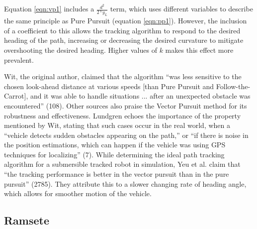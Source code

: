 \documentclass[12pt]{article}
\begin{document}
\begin{flushleft}
Equation \ref{eqn:vp1} includes a $ \frac{d^2}{2\,^V\!\!y_L}$ term, which uses different variables to describe the same principle as Pure Pursuit (equation \ref{eqn:pp1}). However, the inclusion of a coefficient to this allows the tracking algorithm to respond to the desired heading of the path, increasing or decreasing the desired curvature to mitigate overshooting the desired heading. Higher values of $k$ makes this effect more prevalent.

Wit, the original author, claimed that the algorithm ``was less sensitive to the chosen look-ahead distance at various speeds [than Pure Pursuit and Follow-the-Carrot], and it was able to handle situations ... after an unexpected obstacle was encountered'' (108). Other sources also praise the Vector Pursuit method for its robustness and effectiveness.  Lundgren echoes the importance of the property mentioned by Wit, stating that such cases occur in the real world, when a ``vehicle detects sudden obstacles appearing on the path,'' or ``if there is noise in the position estimations, which can happen if the vehicle was using GPS techniques for localizing'' (7). While determining the ideal path tracking algorithm for a submersible tracked robot in simulation, Yeu et al. claim that ``the tracking performance is better in the vector pursuit than in the pure pursuit'' (2785). They attribute this to a slower changing rate of heading angle, which allows for smoother motion of the vehicle.

\subsection{Ramsete}


\end{flushleft}
\end{document}
